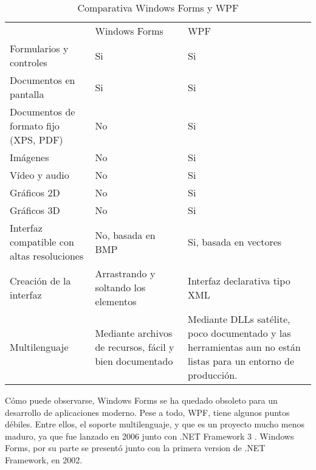 \begin{table}[H]
	\begin{center}
		\begin{tabular}{|p{5cm} | p{4cm} | p{4cm}|}
			\rowcolor{darkgray}                         & \color{white}Windows Forms               & \color{white}WPF \\
			Formularios y controles                     & Si                                       & Si \\
			Documentos en pantalla                      & Si                                       & Si \\
			Documentos de formato fijo (XPS, PDF)       & No                                       & Si \\
			Im\'{a}genes                                & No                                       & Si \\
			V\'{i}deo y audio                           & No                                       & Si \\
			Gr\'{a}ficos 2D                             & No                                       & Si \\
			Gr\'{a}ficos 3D                             & No                                       & Si \\
			Interfaz compatible con altas resoluciones  & No, basada en BMP                        & Si, basada en vectores \\
			Creaci\'{o}n de la interfaz                 & Arrastrando y soltando los elementos     & Interfaz declarativa tipo XML \\
			Multilenguaje                               & Mediante archivos de recursos, f\'{a}cil y bien documentado & Mediante DLLs sat\'{e}lite, poco documentado y las herramientas aun no est\'{a}n listas para un entorno de producci\'{o}n. \\
			\hline
		\end{tabular}
	\end{center}
	\caption[Comparativa Windows Forms y WPF]{Comparativa Windows Forms y WPF}
	\label{ComparativaWPF}
\end{table}

C\'omo puede observarse, Windows Forms se ha quedado obsoleto para un desarrollo de aplicaciones moderno.
Pese a todo, WPF, tiene algunos puntos d\'ebiles. Entre ellos, el soporte multilenguaje, y que es un proyecto
mucho menos maduro, ya que fue lanzado en 2006 junto con .NET Framework 3 \cite{WPF:Overview}. Windows Forms,
por su parte se present\'o junto con la primera version de .NET Framework, en 2002.

